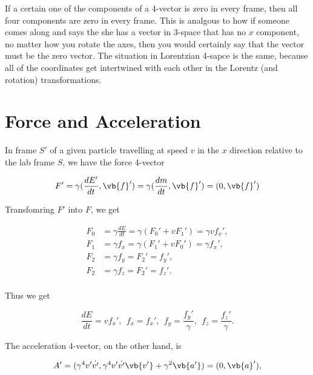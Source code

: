 \documentclass[english,a4paper,12pt]{report}
\begin{document}
If a certain one of the components of a 4-vector is zero in every frame, then all four components are zero in every frame. This is analgous to how if someone comes along and says the she has a vector in 3-space that has no \(x\) component, no matter how you rotate the axes, then you would certainly say that the vector must be the zero vector. The situation in Lorentzian 4-sapce is the same, because all of the coordinates get intertwined with each other in the Lorentz (and rotation) transformations.
\section{Force and Acceleration}

In frame \(S'\) of a given particle travelling at speed \(v\) in the \(x\) direction relative to the lab frame \(S\), we have the force 4-vector

\begin{equation}
    F' = \gamma (\frac{dE'}{dt}, \vb{f} ' ) = \gamma ( \frac{dm}{dt}, \vb{f} ' ) = (0, \vb{f} ')
\end{equation}

Transfomring \(F'\) into \(F\), we get

\begin{equation}
    \begin{aligned}
        F_0 &= \gamma \frac{dE}{dt} = \gamma (F_0 ' + v F_1 ') = \gamma v f_{x}' , \\
        F_1 &= \gamma f_{x} =  \gamma (F_1 ' + v F_0 ') = \gamma f_{x}', \\
        F_2 &= \gamma f_{y} = F_2 ' =  f_{y}' , \\
        F_2 &= \gamma f_{z} = F_2 ' =  f_{z}' . \\
    \end{aligned}
\end{equation}

Thus we get 

\begin{equation}
        \frac{dE}{dt} = vf_{x}',  ~~
        f_{x} = f_{x}', ~~
        f_{y} = \frac{f_{y}' }{\gamma }, ~~
        f_{z} = \frac{f_{z}' }{\gamma }.   
\end{equation}

The acceleration 4-vector, on the other hand, is 

\begin{equation}
    A' = (\gamma ^{4}v' \dot{v'} , \gamma ^{4} v' \dot{v'} \vb{v'} + \gamma ^2 \vb{a'}) = (0,\vb{a} '),
\end{equation}
\end{document}
